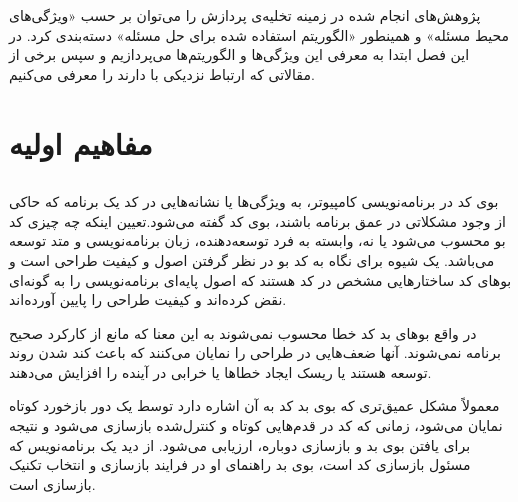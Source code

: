 پژوهش‌های انجام شده در زمینه تخلیه‌ی پردازش را می‌توان بر حسب «ویژگی‌های محیط مسئله» و همینطور «الگوریتم استفاده شده برای حل مسئله» دسته‌بندی کرد. در این فصل ابتدا به معرفی این ویژگی‌ها و الگوریتم‌ها می‌پردازیم و سپس برخی از مقالاتی که ارتباط نزدیکی با \CurrentProject دارند را معرفی می‌کنیم.

\section[مفاهیم اولیه]{مفاهیم اولیه}
\subsection {}
بوی کد در برنامه‌نویسی کامپیوتر، به ویژگی‌ها یا نشانه‌هایی در کد یک برنامه که حاکی از وجود مشکلاتی در عمق برنامه باشند، بوی کد گفته می‌شود.تعیین اینکه چه چیزی کد بو محسوب می‌شود یا نه، وابسته به فرد توسعه‌دهنده، زبان برنامه‌نویسی و متد توسعه می‌باشد.
یک شیوه برای نگاه به کد بو در نظر گرفتن اصول و کیفیت طراحی است و بوهای کد ساختارهایی مشخص در کد هستند که اصول پایه‌ای برنامه‌نویسی را به گونه‌ای نقض کرده‌اند و کیفیت طراحی را پایین آورده‌اند.

در واقع بوهای بد کد خطا محسوب نمی‌شوند به این معنا که مانع از کارکرد صحیح برنامه نمی‌شوند. آنها ضعف‌هایی در طراحی را نمایان می‌کنند که باعث کند شدن روند توسعه هستند یا ریسک ایجاد خطاها یا خرابی در آینده را افزایش می‌دهند.

معمولاً مشکل عمیق‌تری که بوی بد کد به آن اشاره دارد توسط یک دور بازخورد کوتاه نمایان می‌شود، زمانی که کد در قدم‌هایی کوتاه و کنترل‌شده بازسازی می‌شود و نتیجه برای یافتن بوی بد و بازسازی دوباره، ارزیابی می‌شود. از دید یک برنامه‌نویس که مسئول بازسازی کد است، بوی بد راهنمای او در فرایند بازسازی و انتخاب تکنیک بازسازی است.\cite{whatiscodesmell}
